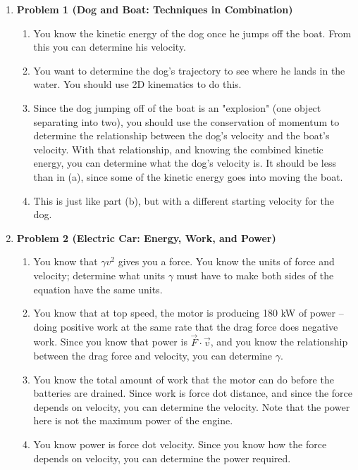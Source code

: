 \documentclass[12pt]{article}
\begin{document}
\begin{enumerate}
	\item \bf Problem 1 (Dog and Boat: Techniques in Combination)\rm 
	\begin{enumerate}
		\item You know the kinetic energy of the dog once he jumps off the boat. From this you can determine his velocity.

\item You want to determine the dog's trajectory to see where he lands in the water. You should use 2D kinematics to do this.
\item Since the dog jumping off of the boat is an "explosion" (one object separating into two), you should use the conservation of momentum to determine the relationship between the dog's velocity and the boat's velocity. With that relationship, and knowing the combined kinetic energy, you can determine what the dog's velocity is. It should be less than in (a), since some of the kinetic energy goes into moving the boat.
\item This is just like part (b), but with a different starting velocity for the dog.
\end{enumerate}
\item \bf Problem 2 (Electric Car: Energy, Work, and Power)\rm 
\begin{enumerate}
	\item You know that $\gamma v^2$ gives you a force. You know the units of force and velocity; determine what units $\gamma$ must have to make both sides of the equation have the same units.
	\item  You know that at top speed, the motor is producing 180 kW of power -- doing positive work at the same rate that the drag force does negative work. Since you know that power is $\vec F \cdot \vec v$, and you know the relationship between the drag force and velocity, you can determine $\gamma$.
	\item  You know the total amount of work that the motor can do before the batteries are drained. Since work is force dot distance, and since the force depends on velocity, you can determine the velocity. Note that the power here is not the maximum power of the engine.
	\item  You know power is force dot velocity. Since you know how the force depends on velocity, you can determine the power required.
\end{enumerate}



\end{enumerate}
\end{document}
